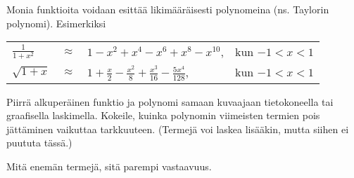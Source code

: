 \begin{tehtava}
	Monia funktioita voidaan esittää likimääräisesti polynomeina (ns. Taylorin polynomi).  	Esimerkiksi
	
	\begin{tabular}{lcll}
	$\frac{1}{1+x^2}$ &$\approx$ & $1-x^2+x^4-x^6+x^8-x^{10}$, & kun $-1<x<1$ \\
	$\sqrt{1+x}$ & $\approx $ & $ 1+\frac{x}{2}
	-\frac{x^2}{8}+\frac{x^3}{16}-\frac{5x^4}{128}$, & kun $-1<x<1$
	\end{tabular}
	
	Piirrä alkuperäinen funktio ja polynomi samaan kuvaajaan tietokoneella tai graafisella laskimella. Kokeile, kuinka polynomin viimeisten termien pois jättäminen vaikuttaa tarkkuuteen. (Termejä voi laskea lisääkin, mutta siihen ei puututa tässä.)

	\begin{vastaus}
		Mitä enemän termejä, sitä parempi vastaavuus.
	\end{vastaus}
\end{tehtava}